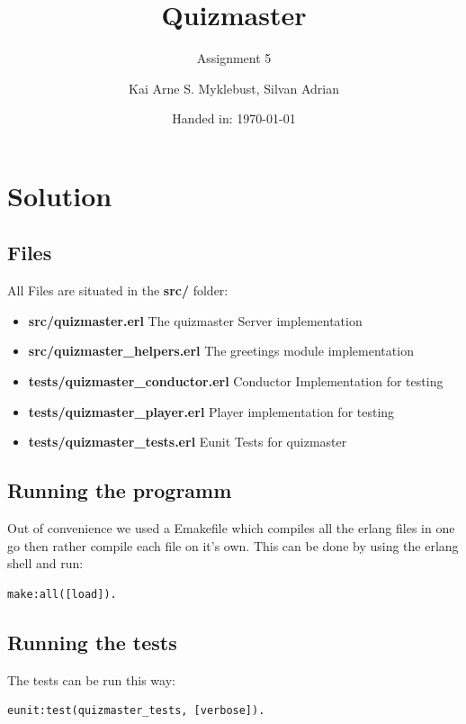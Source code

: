 \documentclass[12pt,a4paper]{article}
\begin{document}
\title{Quizmaster}
\subtitle{Assignment 5}

\author{Kai Arne S. Myklebust, Silvan Adrian}
\date{Handed in: \today}
	
\maketitle
\tableofcontents

\section{Solution}

\subsection{Files}
All Files are situated in the \textbf{src/} folder:
\begin{itemize}
	\item \textbf{src/quizmaster.erl} The quizmaster Server implementation
	\item \textbf{src/quizmaster\_helpers.erl} The greetings module implementation
	\item \textbf{tests/quizmaster\_conductor.erl} Conductor Implementation for testing
	\item \textbf{tests/quizmaster\_player.erl} Player implementation for testing
	\item \textbf{tests/quizmaster\_tests.erl} Eunit Tests for quizmaster
\end{itemize}

\subsection{Running the programm}
Out of convenience we used a Emakefile which compiles all the erlang files in one go then rather compile each file on it's own.
This can be done by using the erlang shell and run:

\begin{verbatim}
make:all([load]).
\end{verbatim}

\subsection{Running the tests}
The tests can be run this way:
\begin{verbatim}
eunit:test(quizmaster_tests, [verbose]).
\end{verbatim}
\end{document}
